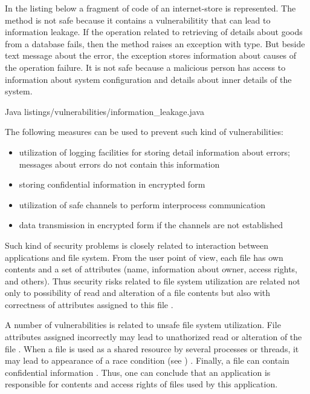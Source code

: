%
In the listing below a fragment of code of an internet-store is represented. 
%
The  method is not safe because it contains a vulnerabilitity that can lead to information leakage. 
%
If the operation related to retrieving of details about goods from a database fails, then the method raises an exception with  type. 
%
But beside text message about the error, the exception stores information about causes of the operation failure. 
%
It is not safe because a malicious person has access to information about system configuration and details about inner details of the system. 

{}
	{Java}
	{listings/vulnerabilities/information_leakage.java}

%
The following measures can be used to prevent such kind of vulnerabilities: 
%
\begin{itemize}
	\item utilization of logging facilities for storing detail information about errors; messages about errors do not contain this information
	\item storing confidential information in encrypted form
	\item utilization of safe channels to perform interprocess communication
	\item data transmission in encrypted form if the channels are not established
\end{itemize}



%
Such kind of security problems is closely related to interaction between applications and file system. 
%
From the user point of view, each file has own contents and a set of attributes (name, information about owner, access rights, and others). 
%
Thus security risks related to file system utilization are related not only to possibility of read and alteration of a file contents but also with correctness of attributes assigned to this file . 

%
A number of vulnerabilities is related to unsafe file system utilization. 
%
File attributes assigned incorrectly may lead to unathorized read or alteration of the file . 
%
When a file is used as a shared resource by several processes or threads, it may lead to appearance of a race condition (see )  . 
%
Finally, a file can contain confidential information . 
%
Thus, one can conclude that an application is responsible for contents and access rights of files used by this application. 

